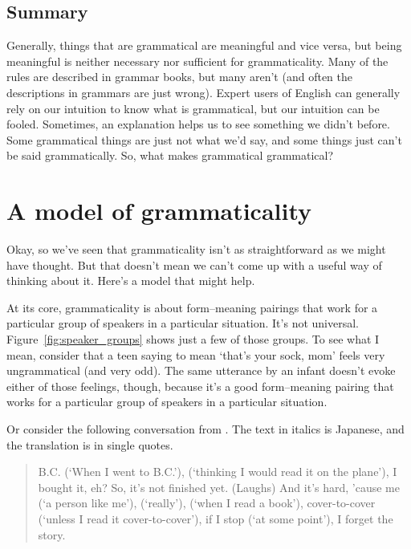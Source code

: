 \subsection{Summary}

Generally, things that are grammatical are meaningful and vice versa, but being meaningful is neither necessary nor sufficient for grammaticality. Many of the rules are described in grammar books, but many aren't (and often the descriptions in grammars are just wrong). Expert users of English can generally rely on our intuition to know what is grammatical, but our intuition can be fooled. Sometimes, an explanation helps us to see something we didn't before. Some grammatical things are just not what we'd say, and some things just can't be said grammatically. So, what makes grammatical grammatical?

\section{A model of grammaticality} \label{sec:gramm-model}

Okay, so we've seen that grammaticality isn't as straightforward as we might have thought. But that doesn't mean we can't come up with a useful way of thinking about it. Here's a model that might help.

At its core, grammaticality is about form--meaning pairings that work for a particular group of speakers in a particular situation. It's not universal. Figure~\ref{fig:speaker_groups} shows just a few of those groups. To see what I mean, consider that a teen saying  to mean `that's your sock, mom' feels very ungrammatical (and very odd). The same utterance by an infant doesn't evoke either of those feelings, though, because it's a good form--meaning pairing that works for a particular group of speakers in a particular situation.

Or consider the following conversation from \citet[179]{nishimura1995}. The text in italics is Japanese, and the translation is in single quotes.

\begin{quote}
    B.C.  (`When I went to B.C.'),  (`thinking I would read it on the plane'), I bought it, eh? So, it's not finished yet. (Laughs) And it's hard, 'cause me (`a person like me'),  (`really'),  (`when I read a book'), cover-to-cover  (`unless I read it cover-to-cover'), if I stop (`at some point'), I forget the story.
\end{quote}

